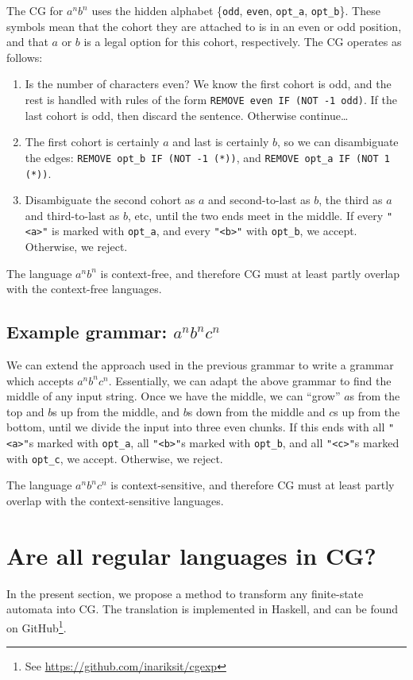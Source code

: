 \documentclass[11pt]{article}
\def\t#1{\texttt{#1}}
\begin{document}
The CG for $a^nb^n$ uses the hidden alphabet \{\t{odd}, \t{even}, \t{opt\_a},
\t{opt\_b}\}. These symbols mean that the cohort they are attached to is in an
even or odd position, and that $a$ or $b$ is a legal option for this cohort,
respectively. The CG operates as follows: 
\begin{enumerate}
\item
  Is the number of characters even? We know the first cohort is odd, and the
  rest is handled with rules of the form \t{REMOVE even IF (NOT -1 odd)}. If the
  last cohort is odd, then discard the sentence. Otherwise continue\dots
\item
  The first cohort is certainly $a$ and last is certainly $b$, so we can
  disambiguate the edges: 
  \t{REMOVE opt\_b IF (NOT -1 (*))}, and \t{REMOVE opt\_a IF (NOT 1 (*))}. 
\item
  Disambiguate the second cohort as $a$ and second-to-last as $b$, the third as
  $a$ and third-to-last as $b$, etc, until the two ends meet in the middle. If
  every \t{"<a>"} is marked with \t{opt\_a}, and every \t{"<b>"} with
  \t{opt\_b}, we accept. Otherwise, we reject.  
\end{enumerate}
The language $a^nb^n$ is context-free, and therefore CG must at least partly
overlap with the context-free languages.


\subsection{Example grammar: $a^nb^nc^n$}
We can extend the approach used in the previous grammar to write a grammar which
accepts $a^nb^nc^n$. Essentially, we can adapt the above grammar to find the
middle of any input string. Once we have the middle, we can ``grow'' $a$s from
the top and $b$s up from the middle, and $b$s down from the middle and $c$s up
from the bottom, until we divide the input into three even chunks.
If this ends with all \t{"<a>"}s marked with \t{opt\_a}, all \t{"<b>"}s marked
with \t{opt\_b}, and all \t{"<c>"}s marked with \t{opt\_c}, we accept.
Otherwise, we reject.

The language $a^nb^nc^n$ is context-sensitive, and therefore CG must at least
partly overlap with the context-sensitive languages. 
%

\section{Are all regular languages in CG?}\label{sec:regular}
In the present section, we propose a method to transform any
finite-state automata into CG. 
The translation is implemented in Haskell,
and can be found on GitHub\footnote{See \url{https://github.com/inariksit/cgexp}}.
\end{document}
